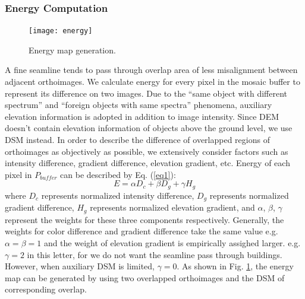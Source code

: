 \documentclass[journal]{IEEEtran}
\begin{document}
\subsubsection{Energy Computation}
\begin{figure}[!t]
	\centering
	\texttt{[image: energy]}
	\caption{Energy map generation.}
	\label{fig:energymap}
\end{figure}
A fine seamline tends to pass through overlap area of less misalignment between adjacent orthoimages. We calculate energy for every pixel in the mosaic buffer to represent its difference on two images. Due to the ``same object with different spectrum'' and ``foreign objects with same spectra'' phenomena, auxiliary elevation information is adopted in addition to image intensity. Since DEM doesn't contain elevation information of objects above the ground level, we use DSM instead. In order to describe the difference of overlapped regions of orthoimages as objectively as possible, we extensively consider factors such as intensity difference, gradient difference, elevation gradient, etc. Energy of each pixel in $P_{buffer}$ can be described by Eq. (\ref{eq1}):
\begin{equation}\label{eq1}
E=\alpha D_{c}+\beta D_{g}+\gamma H_{g}
\end{equation}
where $D_{c}$ represents normalized intensity difference, $D_{g}$ represents normalized gradient difference, $H_{g}$ represents normalized elevation gradient, and $\alpha$, $\beta$, $\gamma$ represent the weights for these three components respectively. Generally, the weights for color difference and gradient difference take the same value e.g. $\alpha = \beta = 1$ and the weight of elevation gradient is empirically assighed larger. e.g. $\gamma = 2$ in this letter, for we do not want the seamline pass through buildings. However, when auxiliary DSM is limited, $\gamma = 0$. As shown in Fig. \ref{fig:energymap}, the energy map can be generated by using two overlapped orthoimages and the DSM of corresponding overlap.
\end{document}
